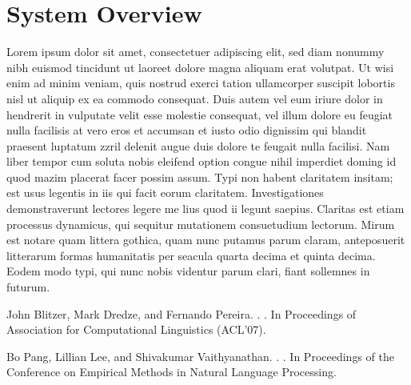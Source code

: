 \documentclass[11pt]{article}
\begin{document}
\section{System Overview}

  Lorem ipsum dolor sit amet, consectetuer adipiscing elit, sed diam nonummy nibh euismod tincidunt ut laoreet dolore magna aliquam erat volutpat. 
  Ut wisi enim ad minim veniam, quis nostrud exerci tation ullamcorper suscipit lobortis nisl ut aliquip ex ea commodo consequat. Duis autem vel eum 
  iriure dolor in hendrerit in vulputate velit esse molestie consequat, vel illum dolore eu feugiat nulla facilisis at vero eros et accumsan et 
  iusto odio dignissim qui blandit praesent luptatum zzril delenit augue duis dolore te feugait nulla facilisi. Nam liber tempor cum soluta nobis 
  eleifend option congue nihil imperdiet doming id quod mazim placerat facer possim assum. Typi non habent claritatem insitam; est usus legentis in 
  iis qui facit eorum claritatem. Investigationes demonstraverunt lectores legere me lius quod ii legunt saepius. Claritas est etiam processus dynamicus, 
  qui sequitur mutationem consuetudium lectorum. Mirum est notare quam littera gothica, quam nunc putamus parum claram, anteposuerit litterarum formas 
  humanitatis per seacula quarta decima et quinta decima. Eodem modo typi, qui nunc nobis videntur parum clari, fiant sollemnes in futurum.

\begin{thebibliography}{}

John Blitzer, Mark Dredze, and Fernando Pereira.
.
.
\newblock In Proceedings of Association for Computational Linguistics (ACL'07).

Bo Pang, Lillian Lee, and Shivakumar Vaithyanathan.
.
.
\newblock In Proceedings of the Conference on Empirical Methods in Natural Language Processing.

\end{thebibliography}
\end{document}
